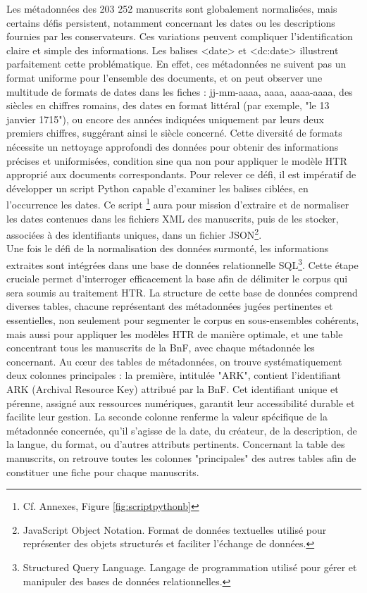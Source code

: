 \documentclass[a4paper,12pt,twoside]{book}
\begin{document}
	Les métadonnées des 203 252 manuscrits sont globalement normalisées, mais certains défis persistent, notamment concernant les dates ou les descriptions fournies par les conservateurs. Ces variations peuvent compliquer l'identification claire et simple des informations. Les balises <date> et <dc:date> illustrent parfaitement cette problématique. En effet, ces métadonnées ne suivent pas un format uniforme pour l'ensemble des documents, et on peut observer une multitude de formats de dates dans les fiches : jj-mm-aaaa, aaaa, aaaa-aaaa, des siècles en chiffres romains, des dates en format littéral (par exemple, "le 13 janvier 1715"), ou encore des années indiquées uniquement par leurs deux premiers chiffres, suggérant ainsi le siècle concerné. Cette diversité de formats nécessite un nettoyage approfondi des données pour obtenir des informations précises et uniformisées, condition sine qua non pour appliquer le modèle HTR approprié aux documents correspondants. Pour relever ce défi, il est impératif de développer un script Python capable d'examiner les balises ciblées, en l'occurrence les dates. Ce script \footnote{Cf. Annexes, Figure \ref{fig:scriptpythonb}} aura pour mission d'extraire et de normaliser les dates contenues dans les fichiers XML des manuscrits, puis de les stocker, associées à des identifiants uniques, dans un fichier JSON\footnote{ JavaScript Object Notation. Format de données textuelles utilisé pour représenter des objets structurés et faciliter l'échange de données.}.
	\\
	
	Une fois le défi de la normalisation des données surmonté, les informations extraites sont intégrées dans une base de données relationnelle SQL\footnote{ Structured Query Language. Langage de programmation utilisé pour gérer et manipuler des bases de données relationnelles.}. Cette étape cruciale permet d'interroger efficacement la base afin de délimiter le corpus qui sera soumis au traitement HTR. La structure de cette base de données comprend diverses tables, chacune représentant des métadonnées jugées pertinentes et essentielles, non seulement pour segmenter le corpus en sous-ensembles cohérents, mais aussi pour appliquer les modèles HTR de manière optimale, et une table concentrant tous les manuscrits de la BnF, avec chaque métadonnée les concernant. Au cœur des tables de métadonnées, on trouve systématiquement deux colonnes principales : la première, intitulée "ARK", contient l'identifiant ARK (Archival Resource Key) attribué par la BnF. Cet identifiant unique et pérenne, assigné aux ressources numériques, garantit leur accessibilité durable et facilite leur gestion. La seconde colonne renferme la valeur spécifique de la métadonnée concernée, qu'il s'agisse de la date, du créateur, de la description, de la langue, du format, ou d'autres attributs pertinents. Concernant la table des manuscrits, on retrouve toutes les colonnes "principales" des autres tables afin de constituer une fiche pour chaque manuscrits.
	
\end{document}
